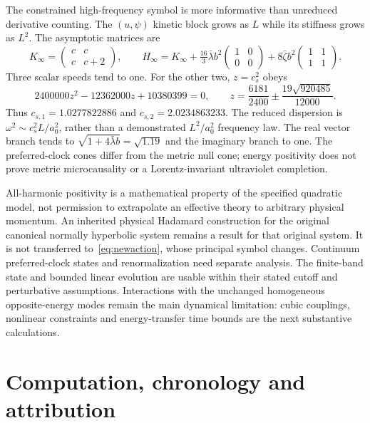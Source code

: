 \documentclass[11pt]{article}
\numberwithin{equation}{section}
\begin{document}
The constrained high-frequency symbol is more informative than unreduced derivative counting.
The $(u,\psi)$ kinetic block grows as $L$ while its stiffness grows as $L^2$.
The asymptotic matrices are
\begin{equation}
 K_\infty=\begin{pmatrix}c&c\\c&c+2\end{pmatrix},\qquad
 H_\infty=K_\infty+\tfrac{16}{3}\bar\lambda b^2\begin{pmatrix}1&0\\0&0\end{pmatrix}
 +8\bar\zeta b^2\begin{pmatrix}1&1\\1&1\end{pmatrix}.
\end{equation}
Three scalar speeds tend to one.
For the other two, $z=c_s^2$ obeys
\begin{equation}
 2400000z^2-12362000z+10380399=0,
 \qquad z=\frac{6181}{2400}\pm\frac{19\sqrt{920485}}{12000}.
\end{equation}
Thus $c_{s,1}=1.0277822886$ and $c_{s,2}=2.0234863233$.
The reduced dispersion is $\omega^2\sim c_s^2L/a_0^2$, rather than a demonstrated $L^2/a_0^2$ frequency law.
The real vector branch tends to $\sqrt{1+4\bar\lambda b}=\sqrt{1.19}$ and the imaginary branch to one.
The preferred-clock cones differ from the metric null cone; energy positivity does not prove metric microcausality or a Lorentz-invariant ultraviolet completion.

All-harmonic positivity is a mathematical property of the specified quadratic model, not permission to extrapolate an effective theory to arbitrary physical momentum.
An inherited physical Hadamard construction for the original canonical normally hyperbolic system remains a result for that original system.
It is not transferred to~\eqref{eq:newaction}, whose principal symbol changes.
Continuum preferred-clock states and renormalization need separate analysis.
The finite-band state and bounded linear evolution are usable within their stated cutoff and perturbative assumptions.
Interactions with the unchanged homogeneous opposite-energy modes remain the main dynamical limitation: cubic couplings, nonlinear constraints and energy-transfer time bounds are the next substantive calculations.

\section*{Computation, chronology and attribution}
\end{document}
